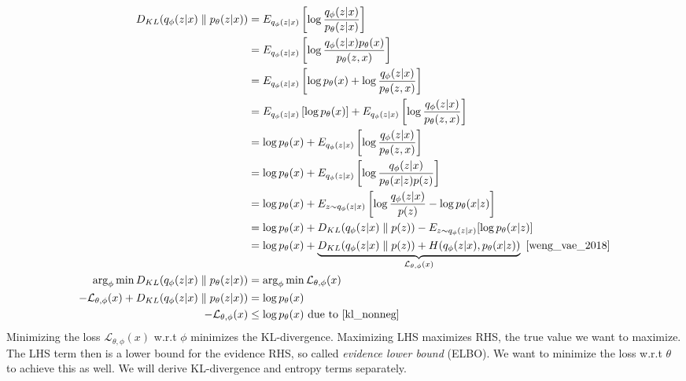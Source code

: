 \documentclass{book}
\numberwithin{equation}{subsection}
\begin{document}
\begin{align}
D_{KL}(q_\phi(z|x) \parallel p_\theta(z|x))
&=E_{q_\phi(z|x)}\left[ \log\frac{q_\phi(z|x)}{p_\theta(z|x)}\right]\\
&=E_{q_\phi(z|x)}\left[ \log\frac{q_\phi(z|x)p_\theta(x)}{p_\theta(z,x)}\right]\\
&=E_{q_\phi(z|x)}\left[ \log p_\theta(x) + \log\frac{q_\phi(z|x)}{p_\theta(z,x)}\right]\\
&=E_{q_\phi(z|x)}\left[\log p_\theta(x)\right] + E_{q_\phi(z|x)}\left[\log\frac{q_\phi(z|x)}{p_\theta(z,x)}\right]\\
&=\log p_\theta(x) + E_{q_\phi(z|x)}\left[\log\frac{q_\phi(z|x)}{p_\theta(z,x)}\right]\\
&=\log p_\theta(x) + E_{q_\phi(z|x)}\left[\log\frac{q_\phi(z|x)}{p_\theta(x|z)p(z)}\right]\\
&=\log p_\theta(x) + E_{z\sim q_\phi(z|x)}\left[\log \frac{q_\phi(z|x)}{p(z)} - \log p_\theta(x| z)\right]\\
&=\log p_\theta(x) + D_{KL}(q_\phi(z|x) \parallel p(z)) - E_{z\sim q_\phi(z|x)}[\log p_\theta(x|z)]\\
&=\log p_\theta(x) + \underbrace{D_{KL}(q_\phi(z|x) \parallel p(z)) + H(q_\phi(z|x), p_\theta(x|z))}_{\mathcal{L}_{\theta, \phi}(x)}~\cite{weng_vae_2018}\\
\arg_\phi\min D_{KL}(q_\phi(z|x) \parallel p_\theta(z|x)) &= \arg_\phi\min \mathcal{L}_{\theta, \phi}(x)\\
-\mathcal{L}_{\theta, \phi}(x)+D_{KL}(q_\phi(z|x) \parallel p_\theta(z|x))
&= \log p_\theta(x)\\
-\mathcal{L}_{\theta, \phi}(x)
&\leq \log p_\theta(x)\ \text{due to~\ref{kl_nonneg}} \label{vae_elbo}
\end{align}
Minimizing the loss $\mathcal{L}_{\theta, \phi}(x)$ w.r.t $\phi$ minimizes the KL-divergence. Maximizing LHS maximizes RHS, the true value we want to maximize. The LHS term then is a lower bound for the evidence RHS, so called \textit{evidence lower bound} (ELBO). We want to minimize the loss w.r.t $\theta$ to achieve this as well. We will derive KL-divergence and entropy terms separately.
\end{document}
